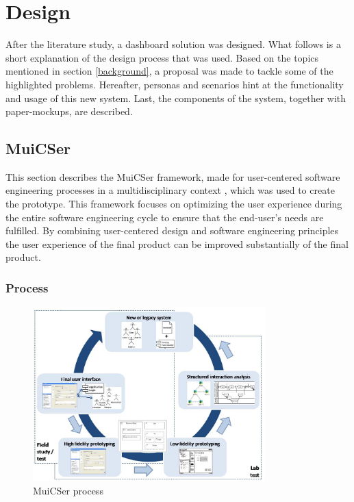 \section{Design} \label{design}

After the literature study, a dashboard solution was designed. What follows is a short explanation of the design process that was used. Based on the topics mentioned in section \ref{background}, a proposal was made to tackle some of the highlighted problems. Hereafter, personas and scenarios hint at the functionality and usage of this new system. Last, the components of the system, together with paper-mockups, are described.

    \subsection{MuiCSer} \label{2_muicser}
    This section describes the MuiCSer framework, made for user-centered software engineering processes in a multidisciplinary context \cite{muicser}, which was used to create the prototype. This framework focuses on optimizing the user experience during the entire software engineering cycle to ensure that the end-user's needs are fulfilled. By combining user-centered design and software engineering principles the user experience of the final product can be improved substantially of the final product.

        \subsubsection{Process}
        
        \begin{figure}[!t]
            \centering
            \includegraphics[width=0.8\textwidth]{chapters/3_design/muicser}
            \caption{MuiCSer process}\label{fig:muicser}
        \end{figure}

